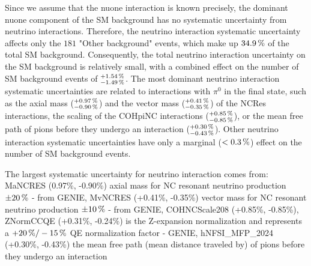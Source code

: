Since we assume that the \gls{nuone} interaction is known precisely, the dominant \gls{nuone} component of the \gls{SM} background has no systematic uncertainty from neutrino interactions. Therefore, the neutrino interaction systematic uncertainty affects only the $181$ "Other background" events, which make up $\unit[34.9]{\%}$ of the total \gls{SM} background. Consequently, the total neutrino interaction uncertainty on the \gls{SM} background is relatively small, with a combined effect on the number of \gls{SM} background events of $^{+\unit[1.54]{\%}}_{-\unit[1.49]{\%}}$.
The most dominant neutrino interaction systematic uncertainties are related to interactions with $\pi^0$ in the final state,  such as the axial mass ($^{\unit[+0.97]{\%}}_{\unit[-0.90]{\%}}$) and the vector mass ($^{\unit[+0.41]{\%}}_{\unit[-0.35]{\%}}$) of the \gls{NC}\gls{Res} interactions, the scaling of the \gls{COHpi}\gls{NC} interactions ($^{\unit[+0.85]{\%}}_{\unit[-0.85]{\%}}$), or the mean free path of pions before they undergo an interaction ($^{\unit[+0.30]{\%}}_{\unit[-0.43]{\%}}$). Other neutrino interaction systematic uncertainties have only a marginal ($<\unit[0.3]{\%}$) effect on the number of \gls{SM} background events.




\iffalse
The largest systematic uncertainty for neutrino interaction comes from:
MaNCRES (0.97\%, -0.90\%) axial mass for NC resonant neutrino production $\pm\unit[20]{\%}$ - from GENIE,
MvNCRES (+0.41\%, -0.35\%) vector mass for NC resonant neutrino production $\pm\unit[10]{\%}$ - from GENIE,
COHNCScale208 (+0.85\%, -0.85\%),
ZNormCCQE (+0.31\%, -0.24\%) is the Z-expansion normalization and represents a $\unit[+20]{\%}/\unit[-15]{\%}$ QE normalization factor - GENIE,
hNFSI\_MFP\_2024 (+0.30\%, -0.43\%) the mean free path (mean distance traveled by) of pions before they undergo an interaction

